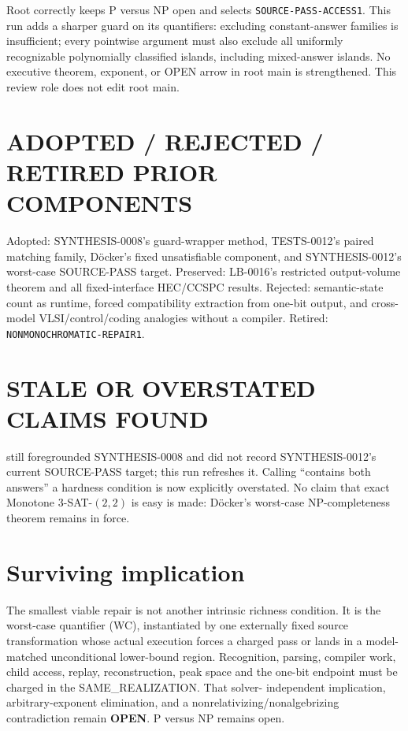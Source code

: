 \documentclass[11pt]{article}
\newcommand{\OPEN}{\textbf{OPEN}}
\begin{document}
Root  correctly keeps P versus NP open and selects
\texttt{SOURCE-PASS-ACCESS1}.  This run adds a sharper guard on its quantifiers:
excluding constant-answer families is insufficient; every pointwise argument
must also exclude all uniformly recognizable polynomially classified islands,
including mixed-answer islands.  No executive theorem, exponent, or OPEN arrow
in root main is strengthened.  This review role does not edit root main.

\section{ADOPTED / REJECTED / RETIRED PRIOR COMPONENTS}

Adopted: SYNTHESIS-0008's guard-wrapper method, TESTS-0012's paired matching
family, D\"ocker's fixed unsatisfiable component, and SYNTHESIS-0012's
worst-case SOURCE-PASS target.  Preserved: LB-0016's restricted output-volume
theorem and all fixed-interface HEC/CCSPC results.  Rejected: semantic-state
count as runtime, forced compatibility extraction from one-bit output, and
cross-model VLSI/control/coding analogies without a compiler.  Retired:
\texttt{NONMONOCHROMATIC-REPAIR1}.

\section{STALE OR OVERSTATED CLAIMS FOUND}

 still foregrounded SYNTHESIS-0008 and did not
record SYNTHESIS-0012's current SOURCE-PASS target; this run refreshes it.
Calling ``contains both answers'' a hardness condition is now explicitly
overstated.  No claim that exact Monotone 3-SAT-$(2,2)$ is easy is made:
D\"ocker's worst-case NP-completeness theorem remains in force.

\section{Surviving implication}

The smallest viable repair is not another intrinsic richness condition.  It is
the worst-case quantifier (WC), instantiated by one externally fixed source
transformation whose actual execution forces a charged pass or lands in a
model-matched unconditional lower-bound region.  Recognition, parsing,
compiler work, child access, replay, reconstruction, peak space and the
one-bit endpoint must be charged in the SAME\_REALIZATION.  That solver-
independent implication, arbitrary-exponent elimination, and a
nonrelativizing/nonalgebrizing contradiction remain \OPEN{}.  P versus NP
remains open.
\end{document}

